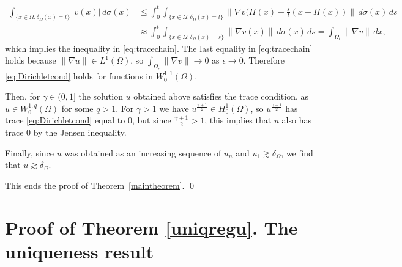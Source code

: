 \documentclass[12pt,a4paper]{amsart}
\theoremstyle{definition}
\begin{document}
\begin{align*}
    \int_{\{ x\in \Omega: \delta_\Omega (x) =t \} } |v(x)| \, d\sigma (x) &\leq \int_0^t \int_{\{ x\in \Omega: \delta_\Omega (x) =t \} }\|\nabla v (\Pi(x) + \frac{s}{t}(x-\Pi(x))\|\, d\sigma (x) \, ds\\
    &\approx \int_0^t \int_{\{x\in \Omega: \delta_\Omega(x) = s\}} \|\nabla v(x)\|\, d\sigma(x)\, ds
    = \int_{\Omega_t} \|\nabla v\|\, dx,
\end{align*}
which implies the inequality in \eqref{eq:tracechain}. The last equality in \eqref{eq:tracechain} holds because $\|\nabla u\|\in L^1(\Omega)$, so $\int_{\Omega_\epsilon} \|\nabla v\| \to 0$ as $\epsilon\to 0$. Therefore \eqref{eq:Dirichletcond} holds for functions in $W^{1,1}_0(\Omega)$.

Then, for $\gamma\in (0,1]$ the solution $u$ obtained above satisfies the trace condition, as $u\in W^{1,q}_0(\Omega)$ for some $q>1$. For $\gamma>1$ we have $u^{\frac{\gamma+1}2} \in H^1_0(\Omega)$, so $u^{\frac{\gamma+1}2}$ has trace \eqref{eq:Dirichletcond} equal to 0, but since $\frac{\gamma+1}2>1$, this implies that $u$ also has trace 0 by the Jensen inequality.

Finally, since $u$ was obtained as an increasing sequence of $u_n$ and $u_1\gtrsim \delta_\Omega$, we find that $u\gtrsim \delta_\Omega$.

This ends the proof of Theorem~\ref{maintheorem}. \qed


\section{Proof of Theorem \ref{uniqregu}. The uniqueness result}\label{sec:uniquenessproof}
\end{document}
